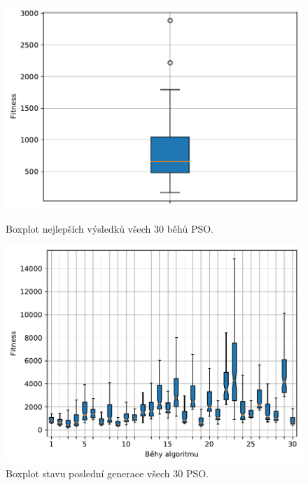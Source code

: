 \begin{figure}[H]
\begin{minipage}[t]{0.475\linewidth}
\includegraphics[width=\linewidth]{obrazky-figures/statistics/Benchmarks/Rosenbrock/PSO/bestsBoxplot_WithOutliers.pdf}
\caption{Boxplot nejlepších výsledků všech $30$ běhů PSO.}
\label{fg:bench:rosenbrock:pso:best}
\end{minipage}
\hfill
\begin{minipage}[t]{0.475\linewidth}
\includegraphics[width=\linewidth]{obrazky-figures/statistics/Benchmarks/Rosenbrock/PSO/lastGenBoxplots.pdf}
\caption{Boxplot stavu poslední generace všech $30$ PSO.}
\label{fg:bench:rosenbrock:pso:lastGen}
\end{minipage}
\end{figure}

